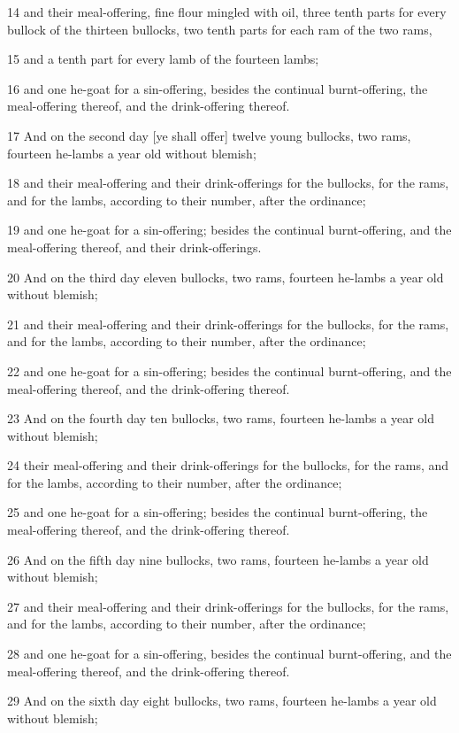 \par 14 and their meal-offering, fine flour mingled with oil, three tenth parts for every bullock of the thirteen bullocks, two tenth parts for each ram of the two rams,
\par 15 and a tenth part for every lamb of the fourteen lambs;
\par 16 and one he-goat for a sin-offering, besides the continual burnt-offering, the meal-offering thereof, and the drink-offering thereof.
\par 17 And on the second day [ye shall offer] twelve young bullocks, two rams, fourteen he-lambs a year old without blemish;
\par 18 and their meal-offering and their drink-offerings for the bullocks, for the rams, and for the lambs, according to their number, after the ordinance;
\par 19 and one he-goat for a sin-offering; besides the continual burnt-offering, and the meal-offering thereof, and their drink-offerings.
\par 20 And on the third day eleven bullocks, two rams, fourteen he-lambs a year old without blemish;
\par 21 and their meal-offering and their drink-offerings for the bullocks, for the rams, and for the lambs, according to their number, after the ordinance;
\par 22 and one he-goat for a sin-offering; besides the continual burnt-offering, and the meal-offering thereof, and the drink-offering thereof.
\par 23 And on the fourth day ten bullocks, two rams, fourteen he-lambs a year old without blemish;
\par 24 their meal-offering and their drink-offerings for the bullocks, for the rams, and for the lambs, according to their number, after the ordinance;
\par 25 and one he-goat for a sin-offering; besides the continual burnt-offering, the meal-offering thereof, and the drink-offering thereof.
\par 26 And on the fifth day nine bullocks, two rams, fourteen he-lambs a year old without blemish;
\par 27 and their meal-offering and their drink-offerings for the bullocks, for the rams, and for the lambs, according to their number, after the ordinance;
\par 28 and one he-goat for a sin-offering, besides the continual burnt-offering, and the meal-offering thereof, and the drink-offering thereof.
\par 29 And on the sixth day eight bullocks, two rams, fourteen he-lambs a year old without blemish;
